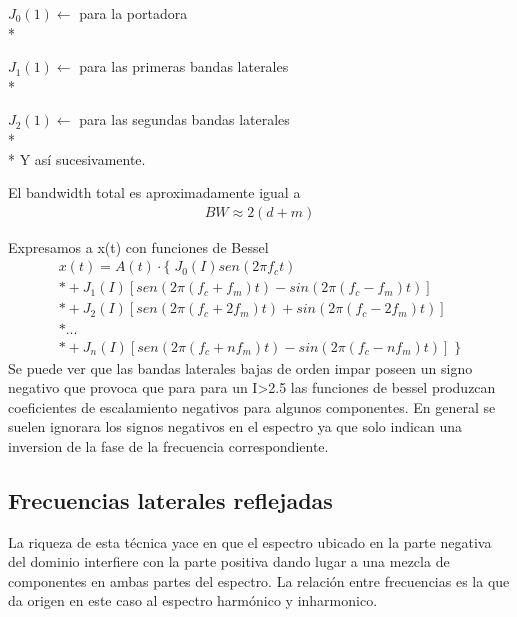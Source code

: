 \documentclass[assd_tp2_main.tex]{subfiles}
\begin{document}
$J_{0}(1)\longleftarrow$  para la portadora \\*

$J_{1}(1)\longleftarrow$  para las primeras bandas laterales \\*

$J_{2}(1)\longleftarrow$  para las segundas bandas laterales \\*
\\*
Y así sucesivamente.

El bandwidth total es aproximadamente igual a
\begin{eqnarray*}
\displaystyle BW \approx 2(d+m)
\end{eqnarray*}

Expresamos a x(t) con funciones de Bessel
\begin{eqnarray*}
\textstyle x(t)=A(t)\cdot \{ \; J_{0}(I)sen(2\pi f_c t) \\*
				+J_1(I)[sen(2\pi(f_c+f_m)t) - sin(2\pi(f_c-f_m)t)] \\*
				+J_2(I)[sen(2\pi(f_c+2f_m)t) + sin(2\pi(f_c-2f_m)t)] \\*
				... \\*
				+J_n(I)[sen(2\pi(f_c+n f_m)t) - sin(2\pi(f_c-n f_m)t)] \; \}
\end{eqnarray*}
Se puede ver que las bandas laterales bajas de orden impar poseen un signo negativo que provoca que para para un I>2.5
las funciones de bessel produzcan coeficientes de escalamiento negativos para algunos componentes.
En general se suelen ignorara los signos negativos en el espectro ya que solo indican una inversion de la fase de la frecuencia correspondiente.


\subsection*{Frecuencias laterales reflejadas}
La riqueza de esta técnica yace en que el espectro ubicado en la parte negativa del dominio interfiere con la parte positiva dando lugar a una mezcla de componentes en ambas partes del espectro. La relación entre frecuencias es la que da origen en este caso al espectro harmónico y inharmonico.
\end{document}
